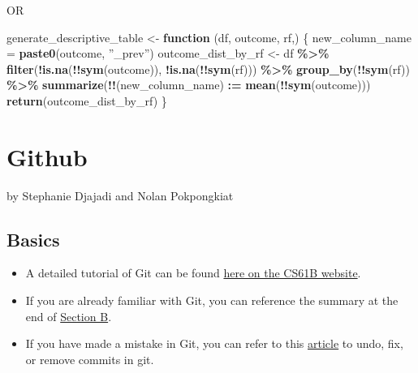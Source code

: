 \documentclass[
]{book}
\newenvironment{Shaded}{\begin{snugshade}}{\end{snugshade}}
\newcommand{\ControlFlowTok}[1]{\textcolor[rgb]{0.13,0.29,0.53}{\textbf{#1}}}
\newcommand{\FunctionTok}[1]{\textcolor[rgb]{0.13,0.29,0.53}{\textbf{#1}}}
\newcommand{\NormalTok}[1]{#1}
\newcommand{\OtherTok}[1]{\textcolor[rgb]{0.56,0.35,0.01}{#1}}
\newcommand{\SpecialCharTok}[1]{\textcolor[rgb]{0.81,0.36,0.00}{\textbf{#1}}}
\providecommand{\tightlist}{%
  \setlength{\itemsep}{0pt}\setlength{\parskip}{0pt}}
\begin{document}
OR

\begin{Shaded}
\begin{Highlighting}[]
\NormalTok{generate\_descriptive\_table }\OtherTok{\textless{}{-}} \ControlFlowTok{function}\NormalTok{ (df, outcome, rf,) \{}
\NormalTok{  new\_column\_name }\OtherTok{=} \FunctionTok{paste0}\NormalTok{(outcome, ”\_prev”)}
\NormalTok{  outcome\_dist\_by\_rf }\OtherTok{\textless{}{-}}\NormalTok{ df }\SpecialCharTok{\%\textgreater{}\%} 
  \FunctionTok{filter}\NormalTok{(}\SpecialCharTok{!}\FunctionTok{is.na}\NormalTok{(}\SpecialCharTok{!!}\FunctionTok{sym}\NormalTok{(outcome)), }\SpecialCharTok{!}\FunctionTok{is.na}\NormalTok{(}\SpecialCharTok{!!}\FunctionTok{sym}\NormalTok{(rf))) }\SpecialCharTok{\%\textgreater{}\%} 
  \FunctionTok{group\_by}\NormalTok{(}\SpecialCharTok{!!}\FunctionTok{sym}\NormalTok{(rf)) }\SpecialCharTok{\%\textgreater{}\%}
  \FunctionTok{summarize}\NormalTok{(}\SpecialCharTok{!!}\NormalTok{(new\_column\_name) }\SpecialCharTok{:=} \FunctionTok{mean}\NormalTok{(}\SpecialCharTok{!!}\FunctionTok{sym}\NormalTok{(outcome))) }
  \FunctionTok{return}\NormalTok{(outcome\_dist\_by\_rf)}
\NormalTok{\}}
\end{Highlighting}
\end{Shaded}

\chapter{Github}\label{github}

by Stephanie Djajadi and Nolan Pokpongkiat

\section{Basics}\label{basics}

\begin{itemize}
\tightlist
\item
  A detailed tutorial of Git can be found \href{https://sp19.datastructur.es/materials/guides/using-git\#b-local-repositories-narrative-introduction}{here on the CS61B website}.
\item
  If you are already familiar with Git, you can reference the summary at the end of \href{https://sp19.datastructur.es/materials/guides/using-git\#b-local-repositories-narrative-introduction}{Section B}.
\item
  If you have made a mistake in Git, you can refer to this \href{https://sethrobertson.github.io/GitFixUm/fixup.html}{article} to undo, fix, or remove commits in git.
\end{itemize}
\end{document}
